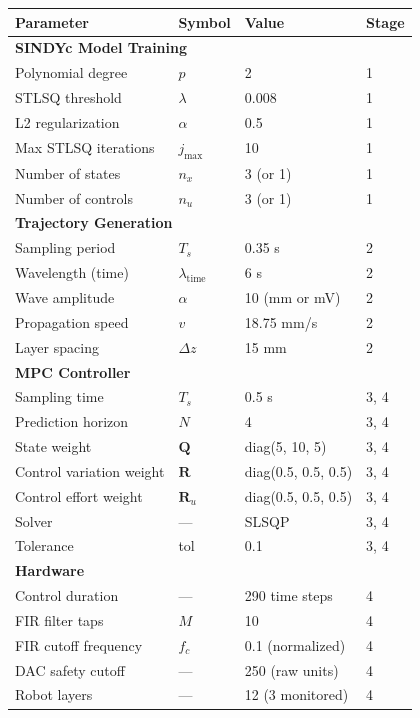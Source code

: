 \documentclass[11pt,a4paper]{article}
\begin{document}
\begin{center}
\renewcommand{\arraystretch}{1.3}
\begin{tabular}{llll}
\toprule
\textbf{Parameter} & \textbf{Symbol} & \textbf{Value} & \textbf{Stage} \\
\midrule
\multicolumn{4}{l}{\textbf{\textcolor{rosepink}{SINDYc Model Training}}} \\
Polynomial degree & $p$ & 2 & 1 \\
STLSQ threshold & $\lambda$ & 0.008 & 1 \\
L2 regularization & $\alpha$ & 0.5 & 1 \\
Max STLSQ iterations & $j_{\max}$ & 10 & 1 \\
Number of states & $n_x$ & 3 (or 1) & 1 \\
Number of controls & $n_u$ & 3 (or 1) & 1 \\
\midrule
\multicolumn{4}{l}{\textbf{\textcolor{roseorange}{Trajectory Generation}}} \\
Sampling period & $T_s$ & 0.35 s & 2 \\
Wavelength (time) & $\lambda_{\text{time}}$ & 6 s & 2 \\
Wave amplitude & $\alpha$ & 10 (mm or mV) & 2 \\
Propagation speed & $v$ & 18.75 mm/s & 2 \\
Layer spacing & $\Delta z$ & 15 mm & 2 \\
\midrule
\multicolumn{4}{l}{\textbf{\textcolor{roseblue}{MPC Controller}}} \\
Sampling time & $T_s$ & 0.5 s & 3, 4 \\
Prediction horizon & $N$ & 4 & 3, 4 \\
State weight & $\mathbf{Q}$ & diag(5, 10, 5) & 3, 4 \\
Control variation weight & $\mathbf{R}$ & diag(0.5, 0.5, 0.5) & 3, 4 \\
Control effort weight & $\mathbf{R}_u$ & diag(0.5, 0.5, 0.5) & 3, 4 \\
Solver & --- & SLSQP & 3, 4 \\
Tolerance & tol & 0.1 & 3, 4 \\
\midrule
\multicolumn{4}{l}{\textbf{\textcolor{rosegreen}{Hardware}}} \\
Control duration & --- & 290 time steps & 4 \\
FIR filter taps & $M$ & 10 & 4 \\
FIR cutoff frequency & $f_c$ & 0.1 (normalized) & 4 \\
DAC safety cutoff & --- & 250 (raw units) & 4 \\
Robot layers & --- & 12 (3 monitored) & 4 \\
\bottomrule
\end{tabular}
\end{center}
\end{document}
